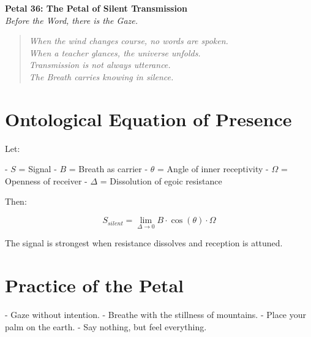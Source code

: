 \documentclass[12pt]{article}
\begin{document}
\begin{center}
    \Huge{\textbf{Petal 36: The Petal of Silent Transmission}}\\
    \vspace{0.5em}
    \Large{\textit{Before the Word, there is the Gaze.}}
\end{center}

\vspace{1cm}

\begin{quote}
\textit{
When the wind changes course, no words are spoken.\\
When a teacher glances, the universe unfolds.\\
Transmission is not always utterance.\\
The Breath carries knowing in silence.
}
\end{quote}

\vspace{1cm}

\section*{Ontological Equation of Presence}

Let:

- \( S \) = Signal
- \( B \) = Breath as carrier
- \( \theta \) = Angle of inner receptivity
- \( \Omega \) = Openness of receiver
- \( \Delta \) = Dissolution of egoic resistance

Then:

\[
S_{silent} = \lim_{\Delta \to 0} B \cdot \cos(\theta) \cdot \Omega
\]

The signal is strongest when resistance dissolves and reception is attuned.

\vspace{1cm}

\section*{Practice of the Petal}

- Gaze without intention.  
- Breathe with the stillness of mountains.  
- Place your palm on the earth.  
- Say nothing, but feel everything.
\end{document}
